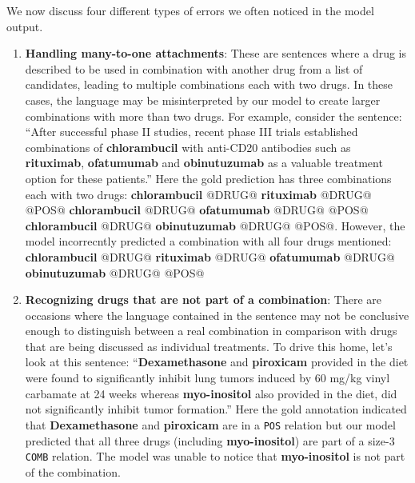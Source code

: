 \documentclass[conference]{IEEEtran}
\begin{document}
We now discuss four different types of errors we often noticed in the model output.
\begin{enumerate}
    \item \textbf{Handling many-to-one attachments}: These are sentences where a drug is described to be used in combination with another drug from a list of candidates, leading to multiple combinations each with two drugs. In these cases, the language may be misinterpreted by our model to create larger combinations with more than two drugs. For example, consider the sentence: ``After successful phase II studies, recent phase III trials established combinations of \textbf{chlorambucil} with anti-CD20 antibodies such as \textbf{rituximab}, \textbf{ofatumumab} and \textbf{obinutuzumab} as a valuable treatment option for these patients.'' Here the gold prediction has three combinations each with two drugs: \textbf{chlorambucil} @DRUG@ \textbf{rituximab} @DRUG@  @POS@ \textbf{chlorambucil} @DRUG@ \textbf{ofatumumab} @DRUG@  @POS@ \textbf{chlorambucil} @DRUG@ \textbf{obinutuzumab} @DRUG@  @POS@. However, the model incorrecntly predicted a combination with all four drugs mentioned: \textbf{chlorambucil} @DRUG@ \textbf{rituximab} @DRUG@ \textbf{ofatumumab} @DRUG@ \textbf{obinutuzumab} @DRUG@ @POS@
    
    \item \textbf{Recognizing drugs that are not part of a combination}: There are occasions where the language contained in the sentence may not be conclusive enough to distinguish between a real combination in comparison with drugs that are being discussed as individual treatments. To drive this home, let's look at this sentence: ``\textbf{Dexamethasone} and \textbf{piroxicam} provided in the diet were found to significantly  inhibit lung tumors induced by 60 mg/kg vinyl carbamate at 24 weeks whereas \textbf{myo-inositol} also provided in the diet, did not significantly inhibit tumor  formation.''
    Here the gold annotation indicated that \textbf{Dexamethasone} and \textbf{piroxicam} are in a \texttt{POS} relation but our model predicted that all three drugs (including \textbf{myo-inositol}) are part of a size-3 \texttt{COMB} relation. The model was unable to notice that \textbf{myo-inositol} is not part of the combination. 


\end{enumerate}
\end{document}
